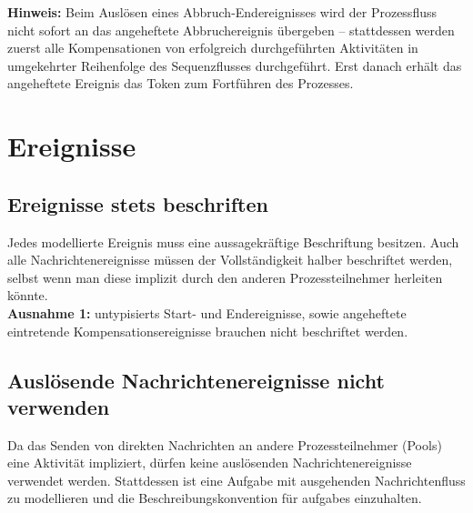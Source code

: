 \documentclass[12pt,report]{../../Templates/snetTeaching}
\begin{document}
\begin{Rahmen}
	\hfill
\end{Rahmen}

\textbf{Hinweis:} Beim Auslösen eines Abbruch-Endereignisses wird der Prozessfluss nicht sofort an das angeheftete Abbruchereignis übergeben -- stattdessen werden zuerst alle Kompensationen von erfolgreich durchgeführten Aktivitäten in umgekehrter Reihenfolge des Sequenzflusses durchgeführt. Erst danach erhält das angeheftete Ereignis das Token zum Fortführen des Prozesses.








\clearpage
\section{Ereignisse}

\subsection{Ereignisse stets beschriften}

Jedes modellierte Ereignis muss eine aussagekräftige Beschriftung besitzen. Auch alle Nachrichtenereignisse müssen der Vollständigkeit halber beschriftet werden, selbst wenn man diese implizit durch den anderen Prozessteilnehmer herleiten könnte.\\
\textbf{Ausnahme 1:} \glspl{untypisiert} Start- und Endereignisse, sowie angeheftete eintretende Kompensationsereignisse brauchen nicht beschriftet werden.\\ 



\begin{Rahmen}
	\hfill
\end{Rahmen}


\subsection{Auslösende Nachrichtenereignisse nicht verwenden}

Da das Senden von direkten Nachrichten an andere Prozessteilnehmer (Pools) eine Aktivität impliziert, dürfen keine auslösenden Nachrichtenereignisse verwendet werden. Stattdessen ist eine Aufgabe mit ausgehenden Nachrichtenfluss zu modellieren und die Beschreibungskonvention für \glspl{aufgabe} einzuhalten.  
\end{document}
